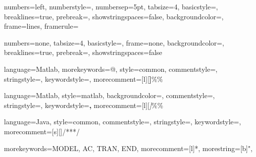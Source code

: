 \usepackage{listings}






{numbers=left,%
  numberstyle=\tiny,%
  numbersep=5pt,%
  tabsize=4,%
  basicstyle=\ttfamily\small,%
  breaklines=true,%
  prebreak={},%
  showstringspaces=false,%
  backgroundcolor=\color{codebackground},%
  frame=lines,
  framerule=\heavyrulewidth
}

{numbers=none,%
  tabsize=4,%
  basicstyle=\ttfamily\footnotesize,%
  frame=none,
  backgroundcolor=\color{white},
  breaklines=true,%
  prebreak={},%
  showstringspaces=false
}


{language=Matlab,%
  morekeywords={@},
  style=common,%
  commentstyle=\color{matlabComment},%
  stringstyle=\color{matlabString},%
  keywordstyle=\color{matlabKeyword},%
  morecomment=[l][\color{matlabCell}\textbf]{\%\%}}

{language=Matlab,%
  style=matlab,%
  backgroundcolor=\color{white},%
  commentstyle=\color{gray},%
  stringstyle=\color{darkgray},%
  keywordstyle=\color{black}\textbf,%
  morecomment=[l][\color{gray}\textit]{\%\%}}

{language=Java,%
  style=common,%
  commentstyle=\color{javaComment},%
  stringstyle=\color{javaString},%
  keywordstyle=\color{javaKeyword},%
  morecomment=[s][\color{javaDocstring}]{/**}{*/}
  }

{morekeywords={MODEL, AC, TRAN, END},
morecomment=[l]{*},
morestring=[b]",
}


